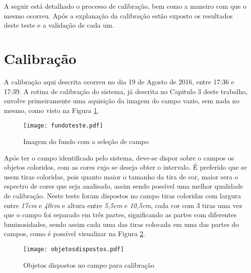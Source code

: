  A seguir está detalhado o processo de calibração, bem como a maneiro com que o mesmo ocorreu. Após a explanação da calibração estão exposto os resultados deste teste e a validação de cada um.
\section{Calibração}
A calibração aqui descrita ocorreu no dia 19 de Agosto de 2016, entre 17:36 e 17:39.
A rotina de calibração do sistema, já descrita no Capitulo 3 deste trabalho, envolve primeiramente uma aquisição da imagem do campo vazio, sem nada no mesmo, como visto na Figura \ref{campovazio}.
\begin{figure}[H]
		\centering
		\texttt{[image: fundoteste.pdf]}
		\caption{Imagem do fundo com a seleção de campo}
		\label{campovazio}
	\end{figure}
Após ter o campo identificado pelo sistema, deve-se dispor sobre o campos os objetos coloridos, com as cores cujo se deseja obter o intervalo. É preferido que se usem tiras coloridas, pois quanto maior o tamanho da tira de cor, maior sera o espectro de cores que seja analisado, assim sendo possível uma melhor qualidade de calibração.
Neste teste foram dispostos no campo tiras coloridas com largura entre \textit{17cm} e \textit{40cm} e altura entre \textit{5,5cm} e \textit{10,5cm}, cada cor com 3 tiras uma vez que o campo foi separado em três partes, significando as partes com diferentes luminosidades, sendo assim cada uma das tiras colocada em uma das partes do campos, como é possível visualizar na Figura \ref{fig:objetodispostos}.
	
	\begin{figure}[H]
\centering
\texttt{[image: objetosdispostos.pdf]}
\caption{Objetos dispostos no campo para calibração}
\label{fig:objetodispostos}
\end{figure}	
	
